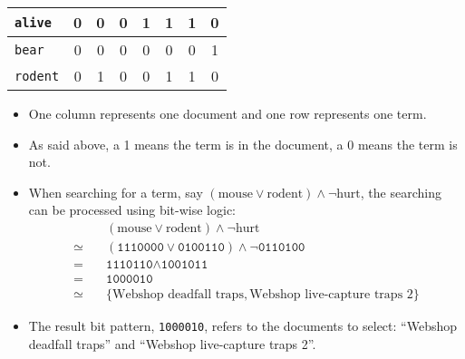 \begin{table}[H]
\begin{tabular}{|l|c|c|c|c|c|c|c|}
        			\texttt{alive}  & \textcolor{irl}{0} & \textcolor{irl}{0} & \textcolor{irl}{0} &         1          &         1          &         1          & \textcolor{irl}{0} \\ \hline
        			\texttt{bear}   & \textcolor{irl}{0} & \textcolor{irl}{0} & \textcolor{irl}{0} & \textcolor{irl}{0} & \textcolor{irl}{0} & \textcolor{irl}{0} &         1          \\ \hline
        			\texttt{rodent} & \textcolor{irl}{0} &         1          & \textcolor{irl}{0} & \textcolor{irl}{0} &         1          &         1          & \textcolor{irl}{0} \\ \hline
        		\end{tabular}
        	\end{table}
            \begin{itemize}
            	\item One column represents one document and one row represents one term.
            	\item As said above, a 1 means the term is in the document, a 0 means the term is not.
            	\item When searching for a term, say \( (\text{mouse} \lor \text{rodent}) \land \lnot\text{hurt} \), the searching can be processed using bit-wise logic:
            		\begin{align*}
	            		       & \quad (\text{mouse} \lor \text{rodent}) \land \lnot\text{hurt} \\
	            		\simeq & \quad (\texttt{1110000} \lor \texttt{0100110}) \land \lnot\texttt{0110100} \\
	            		     = & \quad \texttt{1110110} \land \texttt{1001011} \\
	            		     = & \quad \texttt{1000010} \\
	            		\simeq & \quad \{ \text{Webshop deadfall traps}, \text{Webshop live-capture traps 2} \}
            		\end{align*}
            	\item The result bit pattern, \texttt{1000010}, refers to the documents to select: \enquote{Webshop deadfall traps} and \enquote{Webshop live-capture traps 2}.
            \end{itemize}

